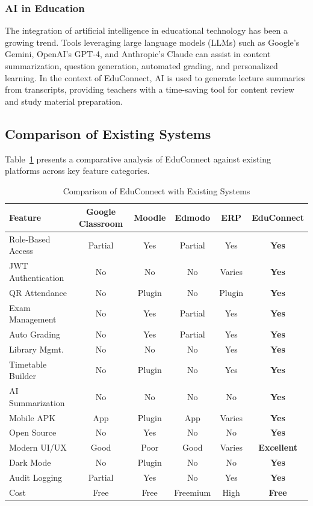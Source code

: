 \subsubsection{AI in Education}
The integration of artificial intelligence in educational technology has been a growing trend. Tools leveraging large language models (LLMs) such as Google's Gemini, OpenAI's GPT-4, and Anthropic's Claude can assist in content summarization, question generation, automated grading, and personalized learning. In the context of EduConnect, AI is used to generate lecture summaries from transcripts, providing teachers with a time-saving tool for content review and study material preparation.

\subsection{Comparison of Existing Systems}

Table~\ref{tab:comparison} presents a comparative analysis of EduConnect against existing platforms across key feature categories.

\begin{table}[H]
\centering
\caption{Comparison of EduConnect with Existing Systems}
\label{tab:comparison}
\footnotesize
\begin{tabular}{|p{3cm}|c|c|c|c|c|}
\hline
\textbf{Feature} & \textbf{Google Classroom} & \textbf{Moodle} & \textbf{Edmodo} & \textbf{ERP} & \textbf{EduConnect} \\
\hline
Role-Based Access & Partial & Yes & Partial & Yes & \textbf{Yes} \\
\hline
JWT Authentication & No & No & No & Varies & \textbf{Yes} \\
\hline
QR Attendance & No & Plugin & No & Plugin & \textbf{Yes} \\
\hline
Exam Management & No & Yes & Partial & Yes & \textbf{Yes} \\
\hline
Auto Grading & No & Yes & Partial & Yes & \textbf{Yes} \\
\hline
Library Mgmt. & No & No & No & Yes & \textbf{Yes} \\
\hline
Timetable Builder & No & Plugin & No & Yes & \textbf{Yes} \\
\hline
AI Summarization & No & No & No & No & \textbf{Yes} \\
\hline
Mobile APK & App & Plugin & App & Varies & \textbf{Yes} \\
\hline
Open Source & No & Yes & No & No & \textbf{Yes} \\
\hline
Modern UI/UX & Good & Poor & Good & Varies & \textbf{Excellent} \\
\hline
Dark Mode & No & Plugin & No & No & \textbf{Yes} \\
\hline
Audit Logging & Partial & Yes & No & Yes & \textbf{Yes} \\
\hline
Cost & Free & Free & Freemium & High & \textbf{Free} \\
\hline
\end{tabular}
\end{table}

